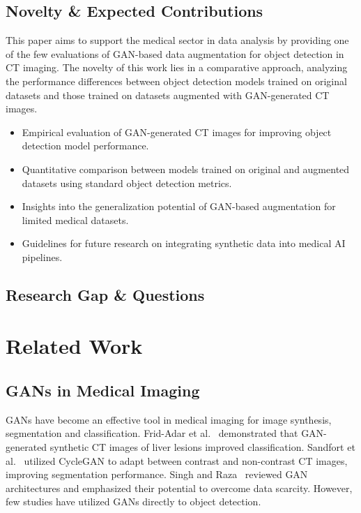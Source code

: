 \documentclass[runningheads]{llncs}
\begin{document}
\subsection{Novelty \& Expected Contributions} %
This paper aims to support the medical sector in data analysis by providing one of the few evaluations of GAN-based data augmentation for object detection in CT imaging. The novelty of this work lies in a comparative approach, analyzing the performance differences between object detection models trained on original datasets and those trained on datasets augmented with GAN-generated CT images.
\begin{itemize}
\item[--] Empirical evaluation of GAN-generated CT images for improving object detection model performance.

\item[--] Quantitative comparison between models trained on original and augmented datasets using standard object detection metrics.

\item[--] Insights into the generalization potential of GAN-based augmentation for limited medical datasets.

\item[--] Guidelines for future research on integrating synthetic data into medical AI pipelines.
\end{itemize}
\subsection{Research Gap \& Questions} %
\section{Related Work}
\subsection{GANs in Medical Imaging} %
GANs have become an effective tool in medical imaging for image synthesis, segmentation and classification. Frid-Adar et al.~\cite{frid2018gan} demonstrated that GAN-generated synthetic CT images of liver lesions improved classification. Sandfort et al.~\cite{sandfort2019data} utilized CycleGAN to adapt between contrast and non-contrast CT images, improving segmentation performance. Singh and Raza~\cite{singh2021medical} reviewed GAN architectures and emphasized their potential to overcome data scarcity. However, few studies have utilized GANs directly to object detection.
\end{document}
